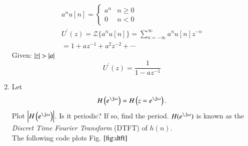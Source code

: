 \documentclass[journal,12pt,twocolumn]{IEEEtran}
\renewcommand\thesection{\arabic{section}}
\begin{document}
\begin{enumerate}[label=\thesection.\arabic*]
		\solution
		\begin{align}
			a^{n}u[n] = \begin{cases} a^{n} & n \geq 0 \\
				0 & n<0\end{cases} \\
			U^{\prime}(z)={\mathcal{Z}}\{a^{n}u[n]\}=\sum_{n=-\infty}^{\infty} a^{n}u[n] z^{-n}\\
			=1+az^{-1}+a^{2}z^{-2}+\cdots
		\end{align}
		Given: $\left\vert z\right\vert > \left\vert a\right\vert$\\
		\begin{equation}
			\label{eq:U'} 
			U^{\prime}(z)=\frac{1}{1-a z^{-1}}
		\end{equation}
		\item Let
		\begin{equation}
			H\brak{e^{\j \omega}} = H\brak{z = e^{\j \omega}}.
		\end{equation}
		Plot $\abs{H\brak{e^{\j \omega}}}$.  Is it periodic? If so, find the period. $H(e^{\j \omega})$ is
		known as the {\em Discret Time Fourier Transform} (DTFT) of $h(n)$.\\
		\solution The following code plots Fig. $\ref{fig:dtft}$
		

\end{enumerate}
\end{document}
